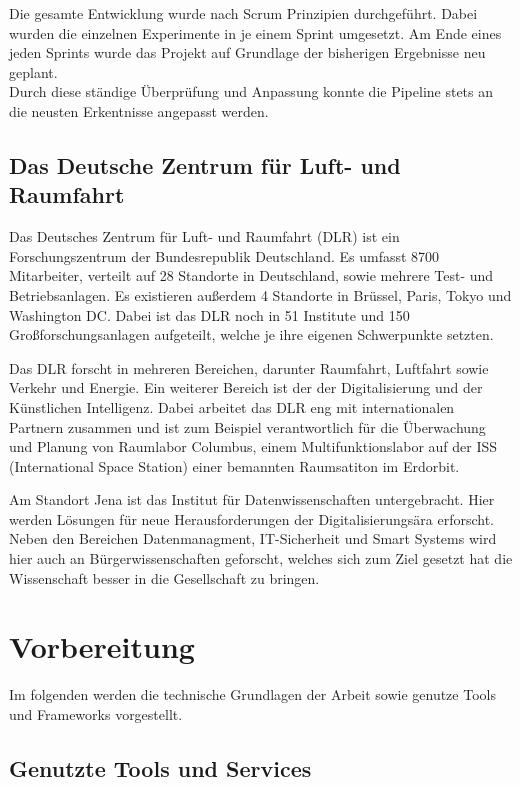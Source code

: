 \documentclass[
]{article}
\begin{document}
Die gesamte Entwicklung wurde nach Scrum Prinzipien durchgeführt. Dabei
wurden die einzelnen Experimente in je einem Sprint umgesetzt. Am Ende
eines jeden Sprints wurde das Projekt auf Grundlage der bisherigen
Ergebnisse neu geplant. \\
Durch diese ständige Überprüfung und Anpassung konnte die Pipeline stets
an die neusten Erkentnisse angepasst werden.

\hypertarget{header-n10}{%
\subsection{Das Deutsche Zentrum für Luft- und
Raumfahrt}\label{header-n10}}

Das Deutsches Zentrum für Luft- und Raumfahrt (DLR) ist ein
Forschungszentrum der Bundesrepublik Deutschland. Es umfasst 8700
Mitarbeiter, verteilt auf 28 Standorte in Deutschland, sowie mehrere
Test- und Betriebsanlagen. Es existieren außerdem 4 Standorte in
Brüssel, Paris, Tokyo und Washington DC. Dabei ist das DLR noch in 51
Institute und 150 Großforschungsanlagen aufgeteilt, welche je ihre
eigenen Schwerpunkte setzten.

Das DLR forscht in mehreren Bereichen, darunter Raumfahrt, Luftfahrt
sowie Verkehr und Energie. Ein weiterer Bereich ist der der
Digitalisierung und der Künstlichen Intelligenz. Dabei arbeitet das DLR
eng mit internationalen Partnern zusammen und ist zum Beispiel
verantwortlich für die Überwachung und Planung von Raumlabor Columbus,
einem Multifunktionslabor auf der ISS (International Space Station)
einer bemannten Raumsatiton im Erdorbit.

Am Standort Jena ist das Institut für Datenwissenschaften untergebracht.
Hier werden Lösungen für neue Herausforderungen der Digitalisierungsära
erforscht. Neben den Bereichen Datenmanagment, IT-Sicherheit und Smart
Systems wird hier auch an Bürgerwissenschaften geforscht, welches sich
zum Ziel gesetzt hat die Wissenschaft besser in die Gesellschaft zu
bringen.

\hypertarget{header-n14}{%
\section{Vorbereitung}\label{header-n14}}

Im folgenden werden die technische Grundlagen der Arbeit sowie genutze
Tools und Frameworks vorgestellt.

\hypertarget{header-n16}{%
\subsection{Genutzte Tools und Services}\label{header-n16}}
\end{document}
